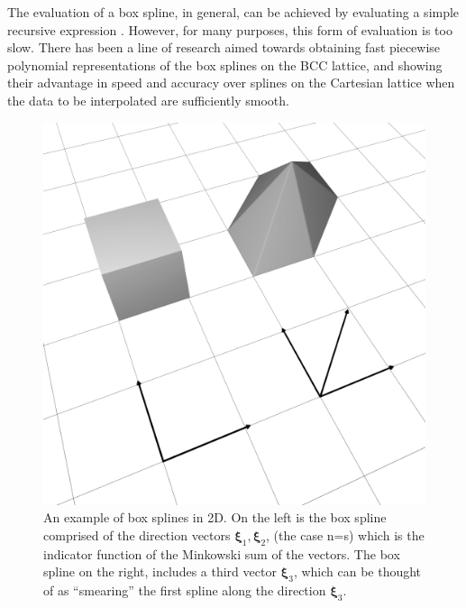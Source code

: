 The evaluation of a box spline, in general, can be achieved by evaluating a simple recursive expression \cite{boorboxsplines}. However, for many purposes, this form of evaluation is too slow. There has been a line of research \cite{firstbox} aimed towards obtaining fast piecewise polynomial representations of the box splines on the BCC lattice, and showing their advantage in speed and accuracy over splines on the Cartesian lattice when the data to be interpolated are sufficiently smooth.

\begin{figure}
  \centering
  \mbox{} \hfill
	\includegraphics[width=\linewidth]{figures/boxspline/2dex}
  \caption{\label{fig:box2d}%
  An example of box splines in 2D. On the left is the box spline comprised of the direction vectors $\mathbf{\xi}_1, \mathbf{\xi}_2$, (the case n=s) which is the indicator function of the Minkowski sum of the vectors. The box spline on the right, includes a third vector $\mathbf{\xi}_3$, which can be thought of as ``smearing'' the first spline along the direction $\mathbf{\xi}_3$.
  }
\end{figure}


